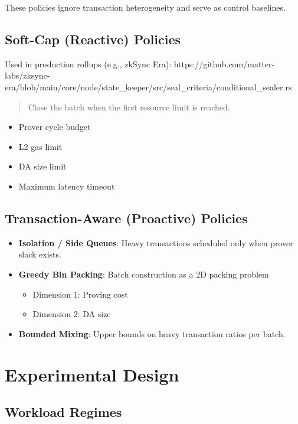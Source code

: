 \documentclass[11pt]{article}
\begin{document}
These policies ignore transaction heterogeneity and serve as control baselines.

\subsection{Soft-Cap (Reactive) Policies}

Used in production rollups (e.g., zkSync Era):
https://github.com/matter-labs/zksync-era/blob/main/core/node/state_keeper/src/seal_criteria/conditional_sealer.rs

\begin{quote}
Close the batch when the first resource limit is reached.
\end{quote}

\begin{itemize}[leftmargin=1.5em]
    \item Prover cycle budget
    \item L2 gas limit
    \item DA size limit
    \item Maximum latency timeout
\end{itemize}

\subsection{Transaction-Aware (Proactive) Policies}

\begin{itemize}[leftmargin=1.5em]
    \item \textbf{Isolation / Side Queues}: Heavy transactions scheduled only when prover slack exists.
    \item \textbf{Greedy Bin Packing}: Batch construction as a 2D packing problem
    \begin{itemize}
        \item Dimension 1: Proving cost
        \item Dimension 2: DA size
    \end{itemize}
    \item \textbf{Bounded Mixing}: Upper bounds on heavy transaction ratios per batch.
\end{itemize}

\section{Experimental Design}

\subsection{Workload Regimes}
\end{document}
